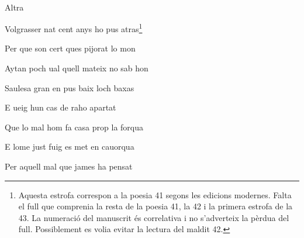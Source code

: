 \documentclass[12pt]{article}
\renewcommand{\espaiAbansEtiquetaPoema}{\vspace{0ex}}
\begin{document}
\begin{estrofa}

\espaiAbansEtiquetaPoema

\\

\begin{rubrica}

Altra

\end{rubrica}

\end{estrofa}


\begin{estrofa}

 Volgrasser nat cent anys ho pus atras\footnote{Aquesta estrofa correspon a la
poesia 41 segons les edicions modernes. Falta el full que comprenia la resta de
la poesia 41, la 42 i la primera estrofa de la 43. La numeraci\'{o} del manuscrit
\'{e}s correlativa i no s'adverteix la p\`{e}rdua del full. Possiblement es volia
evitar la lectura del maldit 42.}

 Per que son cert ques pijorat lo mon

 Aytan poch ual quell mateix no sab hon

 Saulesa gran en pus baix loch baxas

 E ueig hun cas de raho apartat

 Que lo mal hom fa casa prop la forqua

 E lome just fuig es met en cauorqua

 Per aquell mal que james ha pensat

\end{estrofa}





\begin{estrofaBuida}


\end{estrofaBuida}



\begin{estrofaBuida}


\end{estrofaBuida}



\begin{estrofaBuida}


\end{estrofaBuida}



\begin{estrofaBuida}


\end{estrofaBuida}



\begin{estrofaBuida}


\end{estrofaBuida}
\end{document}
